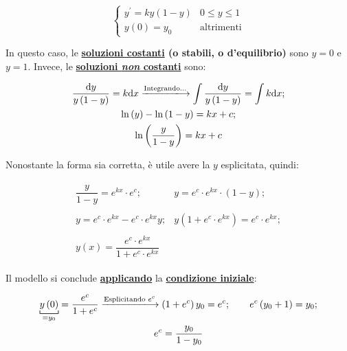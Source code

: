\documentclass[a4paper]{article}
\begin{document}
	\begin{equation*}
		\begin{cases}
			y^{'} = k y\left(1 - y\right) & 0 \le y \le 1 \\
			y\left(0\right) = y_{0} & \text{altrimenti}
		\end{cases}
	\end{equation*}

	\noindent
	In questo caso, le \textbf{\underline{soluzioni costanti} (o stabili, o d'equilibrio)} sono $y = 0$ e $y = 1$. Invece, le \textbf{\underline{soluzioni \emph{non} costanti}} sono:
	
	\begin{gather*}
		\dfrac{\mathrm{d}y}{y\left(1 - y\right)} = k \mathrm{d}x \xlongrightarrow{\text{Integrando...}}
		\int \dfrac{\mathrm{d}y}{y\left(1 - y\right)} = \int k \mathrm{d}x; \\
		\ln\left(y\right) - \ln\left(1 - y\right) = k x + c; \\
		\ln\left(\dfrac{y}{1 - y}\right) = k x + c
	\end{gather*}

	\noindent
	Nonostante la forma sia corretta, è utile avere la $y$ esplicitata, quindi:
	
	\begin{gather*}
		\begin{matrix}
			\dfrac{y}{1 - y} = e^{kx} \cdot e^{c}; & y = e^{c} \cdot e^{kx} \cdot \left(1 - y\right); \\
			\\
			y = e^{c} \cdot e^{kx} - e^{c} \cdot e^{kx} y; & y\left(1 + e^{c} \cdot e^{kx}\right) = e^{c} \cdot e^{kx}; \\
			\\
			y\left(x\right) = \dfrac{e^{c} \cdot e^{kx}}{1 + e^{c} \cdot e^{kx}}
		\end{matrix}
	\end{gather*}

	\noindent
	Il modello si conclude \textbf{\underline{applicando}} la \textbf{\underline{condizione iniziale}}:
	
	\begin{gather*}
		\underbracket[0.14ex]{y\left(0\right)}_{=y_{0}} = \dfrac{e^{c}}{1 + e^{c}} \xlongrightarrow{\text{Esplicitando } e^{c}}
		\left(1 + e^{c}\right) y_{0} = e^{c}; \hspace{2em} e^{c} \left(y_{0} + 1\right) = y_{0}; \\
		e^{c} = \dfrac{y_{0}}{1 - y_{0}}
	\end{gather*}
\end{document}
